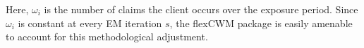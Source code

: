 \documentclass[12pt,letterpaper]{article}
\numberwithin{equation}{section}
\numberwithin{equation}{section}
\numberwithin{equation}{section}
\begin{document}
Here, $\mathcal{\omega}_i$ is the number of claims the client occurs over the exposure period. Since $\mathcal{\omega}_i$ is constant at every EM iteration $s$, the flexCWM package is easily amenable to account for this methodological adjustment.

\end{document}
